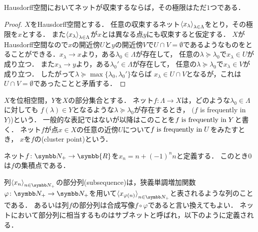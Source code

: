 \documentclass{ltjsbook}
\begin{document}
\begin{thmbox}
\begin{proposition}
Hausdorff空間においてネットが収束するならば，その極限はただ\(1\)つである．
\end{proposition}
\end{thmbox}

\begin{proof} \(X\)をHausdorff空間とする．
任意の収束するネット\({\langle {x}_\lambda \rangle}_{\lambda \in \Lambda}\)をとり，その極限を\(x\)とする．
また\({\langle {x}_\lambda \rangle}_{\lambda \in \Lambda}\)が\(x\)とは異なる点\(y\)にも収束すると仮定する．
\(X\)がHausdorff空間なので\(x\)の開近傍\(U\)と\(y\)の開近傍\(V\)で\(U \cap V = \emptyset\)であるようなものをとることができる．\(x_\lambda \to x\)より，ある\(\lambda_0 \in \Lambda\)が存在して，
任意の\(\lambda \succeq \lambda_0\)で\(x_\lambda \in U\)が成り立つ．
また\(x_\lambda \to y\)より，ある\(\lambda_0' \in \Lambda\)が存在して，
任意の\(\lambda \succeq \lambda_0\)で\(x_\lambda \in V\)が成り立つ．
したがって\(\lambda \succeq \max \{\lambda_0, \lambda_0'\}\)ならば
\(x_\lambda \in U \cap V\)となるが，これは\(U \cap V = \emptyset\)であったことと矛盾する．
\end{proof}

\begin{thmbox}
\begin{definition}
\(X\)を位相空間，\(Y\)を\(X\)の部分集合とする．
ネット\(f \colon \Lambda \to X\)は，どのような\(\lambda_0 \in \Lambda\)に対しても
\(f(\lambda) \in Y\)となるような\(\lambda \succeq \lambda_0\)が存在するとき，
\((f\) is frequently in \(Y)\))という．
一般的な表記ではないが以降はこのことを\(f \mathrel{\text{is frequently in}} Y\)と書く．
ネット\(f\)が点\(x \in X\)の任意の近傍\(U\)について\(f \mathrel{\text{is frequently in}} U\)をみたすとき，
\(x\)を\(f\)の(cluster point)という．
\end{definition}
\end{thmbox}

\begin{exa}
ネット\(f\colon \PositiveInteger \to \symbb{R}\)を\(x_n = n + (-1)^n n\)と定義する．
このとき\(0\)は\(f\)の集積点である．
\end{exa}


列\(\Sequencen{x}\)の部分列(subsequence)は，狭義単調増加関数\(\varphi\colon\PositiveInteger\to\PositiveInteger\)を用いて\(\Subsequence{x}\)と表されるような列のことである．
あるいは列\(f\)の部分列は合成写像\(f\circ \varphi\)であると言い換えてもよい．
ネットにおいて部分列に相当するものはサブネットと呼ばれ，以下のように定義される．
\end{document}
